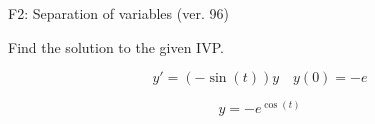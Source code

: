 \begin{exercise}
  \begin{exerciseTitle}F2: Separation of variables (ver. 96)\end{exerciseTitle}
  \begin{exerciseStatement}
    
Find the solution to the given IVP.

    
\[y'=( -\sin\left(t\right) )y\hspace{1em} y(0)= -e\]

  \end{exerciseStatement}
  \begin{exerciseAnswer}
    
\[y= -e^{\cos\left(t\right)}\]

  \end{exerciseAnswer}
\end{exercise}